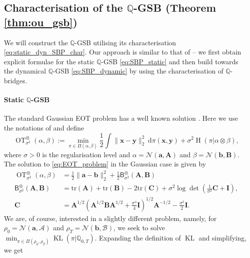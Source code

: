 \documentclass{article}
\newcommand{\Ent}{\operatorname{H}}
\newcommand{\diff}{\mathrm{d}}
\newcommand{\tr}{\mathrm{tr}}
\newcommand{\Nc}{\mathcal{N}}
\newcommand{\Ac}{\mathcal{A}}
\newcommand{\Bc}{\mathcal{B}}
\newcommand{\KL}{\operatorname{KL}}
\theoremstyle{newstyle}
\begin{document}
\subsection{Characterisation of the $\mathbb{Q}$-GSB (Theorem \ref{thm:ou_gsb})}\label{sec:mvOU_GSB_derivation}

We will construct the $\mathbb{Q}$-GSB utilising its characterisation \eqref{eq:static_dyn_SBP_char}. Our approach is similar to that of \cite{bunne2023schrodinger} -- we first obtain explicit formulae for the static $\mathbb{Q}$-GSB \eqref{eq:SBP_static} and then build towards the dynamical $\mathbb{Q}$-GSB \eqref{eq:SBP_dynamic} by using the characterisation of $\mathbb{Q}$-bridges.

\paragraph{Static $\mathbb{Q}$-GSB}
The standard Gaussian EOT problem has a well known solution \cite{mallasto2022entropy, janati2021advances, bunne2023schrodinger, janati2020entropic}. Here we use the notations of \cite{janati2021advances} and define
\begin{equation}
  \operatorname{OT}_{\sigma^2}^\otimes(\alpha, \beta) := \min_{\pi \in \Pi(\alpha, \beta)} \frac{1}{2} \int \| \bm{x} - \bm{y} \|_2^2 \: \diff \pi(\bm{x}, \bm{y}) + \sigma^2 \Ent(\pi | \alpha \otimes \beta), \label{eq:EOT_problem}
\end{equation}
where $\sigma > 0$ is the regularisation level and $\alpha = \Nc(\bm{a}, \bm{A})$ and $\beta = \Nc(\bm{b}, \bm{B})$. The solution to \eqref{eq:EOT_problem} in the Gaussian case is given by \cite[Theorem 1]{janati2021advances}
\begin{align}
  \operatorname{OT}_{\sigma^2}^\otimes(\alpha, \beta) &= \frac{1}{2} \| \bm{a} - \bm{b} \|_2^2 + \frac{1}{2} \mathsf{B}^{\otimes}_{\sigma^2}\left( \bm{A}, \bm{B} \right) \label{eq:GSB_a}\\
  \mathsf{B}^{\otimes}_{\sigma^2}(\bm{A}, \bm{B}) &= \tr(\bm{A}) + \tr(\bm{B}) - 2\tr(\bm{C}) + \sigma^2 \log \det \left( \frac{1}{\sigma^2} \bm{C} + \bm{I} \right), \label{eq:GSB_b} \\
  \bm{C} &= \bm{A}^{1/2} \left( \bm{A}^{1/2} \bm{B} \bm{A}^{1/2} + \frac{\sigma^4}{4} \bm{I} \right)^{1/2} \bm{A}^{-1/2} - \frac{\sigma^2}{2} \bm{I}. \label{eq:GSB_c}
\end{align}
We are, of course, interested in a slightly different problem, namely, for $\rho_0 = \Nc(\bm{a}, \bm{\Ac})$ and $\rho_T = \Nc(\bm{b}, \bm{\Bc})$, we seek to solve $\min_{\pi \in \Pi(\rho_0, \rho_T)} \KL(\pi | \mathbb{Q}_{0, T})$. Expanding the definition of $\KL$ and simplifying, we get
\end{document}
